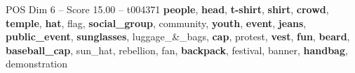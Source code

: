 \begin{textsample}{POS Dim 6 – Score 15.00 – t004371}  \label{ex:f6_pos_025}
\textbf{people}, \textbf{head}, \textbf{t-shirt}, \textbf{shirt}, \textbf{crowd}, \textbf{temple}, \textbf{hat}, flag, \textbf{social\_group}, community, \textbf{youth}, \textbf{event}, \textbf{jeans}, \textbf{public\_event}, \textbf{sunglasses}, luggage\_\&\_bags, \textbf{cap}, protest, \textbf{vest}, \textbf{fun}, \textbf{beard}, \textbf{baseball\_cap}, sun\_hat, rebellion, fan, \textbf{backpack}, festival, banner, \textbf{handbag}, demonstration

\end{textsample}
